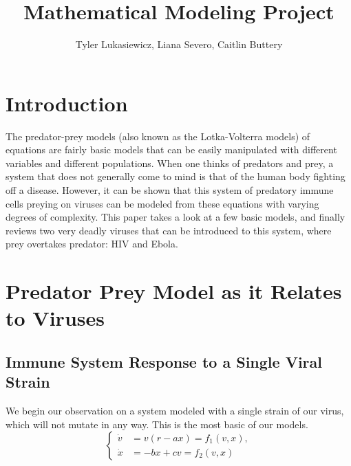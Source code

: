 \documentclass{article}
\title{Mathematical Modeling Project}
\author{Tyler Lukasiewicz, Liana Severo, Caitlin Buttery}
\begin{document}
\tableofcontents
\maketitle
{}
\section{Introduction}
\label{sec:Introduction}
The predator-prey models (also known as the Lotka-Volterra models) of equations are fairly basic models that can be easily manipulated with different variables and different populations. When one thinks of predators and prey, a system that does not generally come to mind is that of the human body fighting off a disease. However, it can be shown that this system of predatory immune cells preying on viruses can be modeled from these equations with varying degrees of complexity. This paper takes a look at a few basic models, and finally reviews two very deadly viruses that can be introduced to this system, where prey overtakes predator: HIV and Ebola.


\section{Predator Prey Model as it Relates to Viruses}
\label{sec:Main part}

\subsection{Immune System Response to a Single Viral Strain}
We begin our observation on a system modeled with a single strain of our virus, which will not mutate in any way. This is the most basic of our models. 
\begin{equation}
    \begin{cases}
        \dot v &= v(r-ax) = f_1(v,x), \\
        \dot x &= -bx + cv = f_2(v,x)
    \end{cases}
\end{equation}
\end{document}
